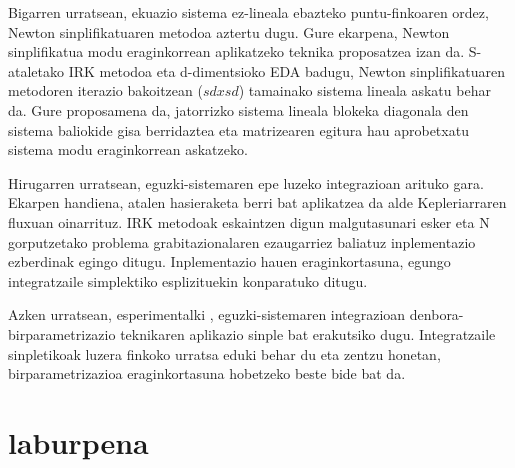 Bigarren urratsean, ekuazio sistema ez-lineala ebazteko puntu-finkoaren ordez, Newton sinplifikatuaren metodoa aztertu dugu. Gure ekarpena, Newton sinplifikatua modu eraginkorrean aplikatzeko teknika proposatzea izan da. S-ataletako IRK metodoa eta d-dimentsioko EDA badugu, Newton sinplifikatuaren metodoren iterazio bakoitzean ($sdxsd$) tamainako sistema lineala askatu behar da. Gure proposamena da, jatorrizko sistema lineala blokeka diagonala den sistema baliokide gisa berridaztea eta matrizearen egitura hau aprobetxatu sistema modu eraginkorrean askatzeko.

Hirugarren urratsean, eguzki-sistemaren epe luzeko integrazioan arituko gara. Ekarpen handiena, atalen hasieraketa berri bat aplikatzea da alde Kepleriarraren fluxuan oinarrituz. IRK metodoak eskaintzen digun malgutasunari esker eta N gorputzetako problema grabitazionalaren ezaugarriez baliatuz inplementazio ezberdinak egingo ditugu. Inplementazio hauen eraginkortasuna, egungo integratzaile simplektiko esplizituekin konparatuko ditugu.

Azken urratsean, esperimentalki , eguzki-sistemaren integrazioan  denbora-birparametrizazio teknikaren aplikazio sinple bat erakutsiko dugu. Integratzaile sinpletikoak luzera finkoko urratsa eduki behar du eta zentzu honetan, birparametrizazioa eraginkortasuna hobetzeko beste bide bat da.             
      
\section{laburpena}

